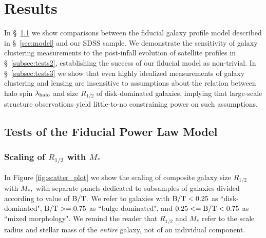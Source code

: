 \documentclass[usenatbib,usegraphicx,letterpaper]{mn2e}
\newcommand{\rhalf}{R_{1/2}}
\newcommand{\bt}{{\rm B/T}}
\newcommand{\mstar}{M_{\ast}}
\newcommand{\halospin}{\lambda_{\rm halo}}
\begin{document}
\section{Results}
\label{sec:results}

In \S~\ref{subsec:tests1} we show comparisons between the fiducial galaxy profile model described in \S~\ref{sec:model} and our SDSS sample. We demonstrate the sensitivity of galaxy clustering measurements to the post-infall evolution of satellite profiles in \S~\ref{subsec:tests2}, establishing the success of our fiducial model as non-trivial. In \S~\ref{subsec:tests3} we show that even highly idealized measurements of galaxy clustering and lensing are insensitive to assumptions about the relation between halo spin $\halospin$ and size $\rhalf$ of disk-dominated galaxies, implying that large-scale structure observations yield little-to-no constraining power on such assumptions.

\subsection{Tests of the Fiducial Power Law Model}
\label{subsec:tests1}

\subsubsection{Scaling of $\rhalf$ with $\mstar$}
\label{subsubsec:scaling_relation}

In Figure \ref{fig:scatter_plot} we show the scaling of composite galaxy size $\rhalf$ with $\mstar,$ with separate panels dedicated to subsamples of galaxies divided according to value of $\bt.$ We refer to galaxies with $\bt<0.25$ as ``disk-dominated", $\bt>=0.75$ as ``bulge-dominated", and $0.25<=\bt<0.75$ as ``mixed morphology". We remind the reader that $\rhalf$ and $\mstar$ refer to the scale radius and stellar mass of the {\em entire} galaxy, not of an individual component.
\end{document}
